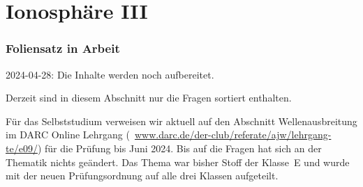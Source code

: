 
\section{Ionosphäre III}
\label{section:ionosphaere_3}
\begin{frame}%

\frametitle{Foliensatz in Arbeit}
2024-04-28: Die Inhalte werden noch aufbereitet.

Derzeit sind in diesem Abschnitt nur die Fragen sortiert enthalten.

Für das Selbststudium verweisen wir aktuell auf den Abschnitt Wellenausbreitung im DARC Online Lehrgang (\textcolor{DARCblue}{\faLink~\href{https://www.darc.de/der-club/referate/ajw/lehrgang-te/e09/}{www.darc.de/der-club/referate/ajw/lehrgang-te/e09/}}) für die Prüfung bis Juni 2024. Bis auf die Fragen hat sich an der Thematik nichts geändert. Das Thema war bisher Stoff der Klasse~E und wurde mit der neuen Prüfungsordnung auf alle drei Klassen aufgeteilt.

\end{frame}

